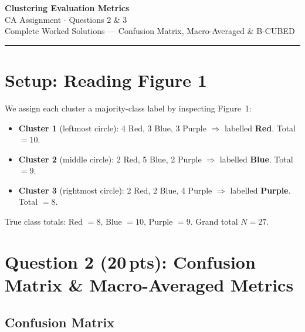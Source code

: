 \documentclass[11pt, a4paper]{article}
\begin{document}

\begin{center}
  {\LARGE\bfseries\color{darkblue} Clustering Evaluation Metrics}\\[4pt]
  {\normalsize CA Assignment $\cdot$ Questions 2 \& 3}\\[2pt]
  {\normalsize Complete Worked Solutions --- Confusion Matrix, Macro-Averaged \& B-CUBED}
\end{center}

\vspace{4pt}
\textcolor{framebd}{\rule{\linewidth}{0.8pt}}
\vspace{6pt}

\section{Setup: Reading Figure 1}

We assign each cluster a majority-class label by inspecting Figure~1:

\begin{itemize}
  \item \textbf{Cluster 1} (leftmost circle): 4 Red, 3 Blue, 3 Purple
        $\Rightarrow$ labelled \textbf{Red}. Total $= 10$.
  \item \textbf{Cluster 2} (middle circle): 2 Red, 5 Blue, 2 Purple
        $\Rightarrow$ labelled \textbf{Blue}. Total $= 9$.
  \item \textbf{Cluster 3} (rightmost circle): 2 Red, 2 Blue, 4 Purple
        $\Rightarrow$ labelled \textbf{Purple}. Total $= 8$.
\end{itemize}

True class totals: Red $= 8$,\; Blue $= 10$,\; Purple $= 9$.\quad
Grand total $N = 27$.

\section{Question 2 (20\,pts): Confusion Matrix \& Macro-Averaged Metrics}

\subsection{Confusion Matrix}
\end{document}
